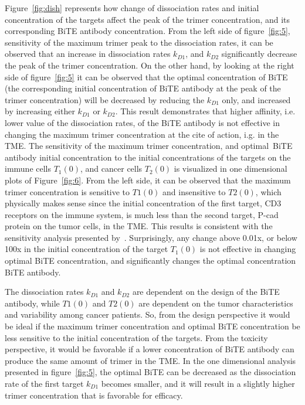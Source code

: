 Figure~\ref{fig:dish} represents how change of dissociation rates and initial concentration of the targets affect the peak of the trimer concentration, and its corresponding \ac{BiTE} antibody concentration. From the left side of figure~\ref{fig:5}, sensitivity of the maximum trimer peak to the dissociation rates, it can be observed that an increase in dissociation rates $k_{D1}$, and $k_{D2}$ significantly decrease the peak of the trimer concentration. On the other hand, by looking at the right side of figure~\ref{fig:5} it can be observed that the optimal concentration of \ac{BiTE} (the corresponding initial concentration of \ac{BiTE} antibody at the peak of the trimer concentration) will be decreased by reducing the $k_{D1}$ only, and increased by increasing either $k_{D1}$ or $k_{D2}$. This result demonstrates that higher affinity, i.e. lower value of the dissociation rates, of the \ac{BiTE} antibody is not effective in changing the maximum trimer concentration at the cite of action, i.g. in the \ac{TME}. The sensitivity of the maximum trimer concentration, and optimal~\ac{BiTE} antibody initial concentration to the initial concentrations of the targets on the immune cells $T_1(0)$, and cancer cells $T_2(0)$ is visualized in one dimensional plots of Figure~\ref{fig:6}. From the left side, it can be observed that the maximum trimer concentration is sensitive to $T1(0)$ and insensitive to $T2(0)$, which physically makes sense since the initial concentration of the first target, CD3 receptors on the immune system, is much less than the second target, P-cad protein on the tumor cells, in the \ac{TME}. This results is consistent with the sensitivity analysis presented by~\cite{betts2019translational}. Surprisingly, any change above 0.01x, or below 100x in the initial concentration of the target $T_1(0)$ is not effective in changing optimal \ac{BiTE} concentration, and significantly changes the optimal concentration \ac{BiTE} antibody.

The dissociation rates $k_{D1}$ and $k_{D2}$ are dependent on the design of the \ac{BiTE} antibody, while $T1(0)$ and $T2(0)$ are dependent on the tumor characteristics and variability among cancer patients. So, from the design perspective it would be ideal if the maximum trimer concentration and optimal \ac{BiTE} concentration be less sensitive to the initial concentration of the targets. From the toxicity perspective, it would be favorable if a lower concentration of \ac{BiTE} antibody can produce the same amount of trimer in the \ac{TME}. In the one dimensional analysis presented in figure~\ref{fig:5}, the optimal \ac{BiTE} can be decreased as the dissociation rate of the first target $k_{D1}$ becomes smaller, and it will result in a slightly higher trimer concentration that is favorable for efficacy.

